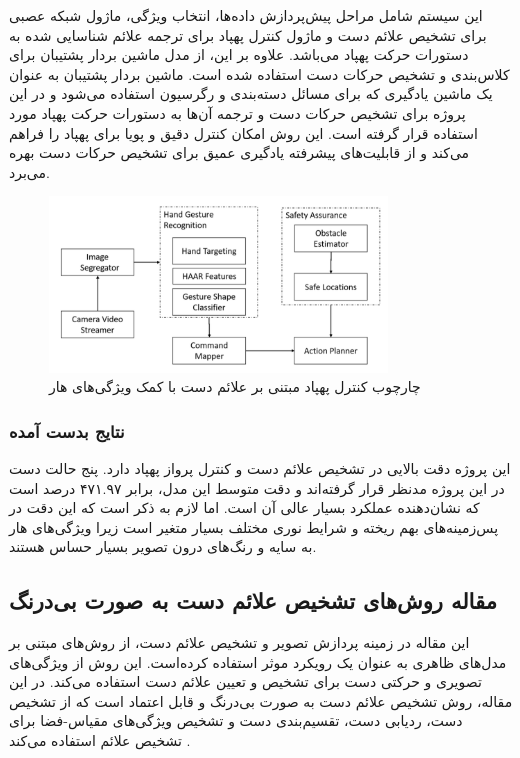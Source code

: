 این سیستم شامل مراحل پیش‌پردازش داده‌ها، انتخاب ویژگی، ماژول شبکه عصبی برای تشخیص علائم دست و ماژول کنترل پهپاد برای ترجمه 
علائم‌ شناسایی شده به دستورات حرکت پهپاد می‌باشد. علاوه بر این، از مدل ماشین بردار پشتیبان برای کلاس‌بندی و تشخیص حرکات دست استفاده شده است. ماشین بردار پشتیبان به عنوان یک ماشین یادگیری 
 که برای مسائل دسته‌بندی و رگرسیون استفاده می‌شود و در این پروژه برای تشخیص حرکات دست و ترجمه آن‌ها به دستورات حرکت پهپاد مورد استفاده قرار گرفته است. این روش امکان 
کنترل دقیق و پویا برای پهپاد را فراهم می‌کند و از قابلیت‌های پیشرفته یادگیری عمیق برای تشخیص حرکات دست بهره می‌برد.

\begin{figure}[h]
    \centering
    \includegraphics[width=0.8\textwidth]{Haar2.png}
    \caption[چارچوب کنترل پهپاد مبتنی بر علائم دست با کمک ویژگی‌های هار]{چارچوب کنترل پهپاد مبتنی بر علائم دست با کمک ویژگی‌های هار\cite{natarajan2018hand}}
\end{figure}

\subsubsection{\protect\textbf{ نتایج بدست آمده}}
این پروژه دقت بالایی در تشخیص علائم دست و کنترل پرواز پهپاد دارد. پنج حالت دست در این پروژه مدنظر قرار گرفته‌اند و دقت متوسط این مدل، برابر ۴۷۱.۹۷ درصد 
است که نشان‌دهنده عملکرد بسیار عالی آن است. اما لازم به ذکر است که این دقت در پس‌زمینه‌های بهم ریخته و شرایط نوری مختلف 
بسیار متغیر است زیرا ویژگی‌های هار به سایه و رنگ‌های درون تصویر بسیار حساس هستند.



\subsection[مقاله روش‌های تشخیص علائم دست به صورت بی‌درنگ]{مقاله روش‌های تشخیص علائم دست به صورت بی‌درنگ \protect{}}
این مقاله در زمینه پردازش تصویر و تشخیص علائم‌ دست، از روش‌های مبتنی بر مدل‌های ظاهری به عنوان یک رویکرد موثر استفاده کرده‌‌است.
این روش‌ از ویژگی‌های تصویری و حرکتی دست برای تشخیص و تعیین علائم‌ دست استفاده می‌کند. در این مقاله، روش تشخیص علائم دست به صورت بی‌درنگ و 
قابل اعتماد است که  از تشخیص دست، ردیابی دست، تقسیم‌بندی دست و تشخیص ویژگی‌های مقیاس-فضا برای تشخیص علائم استفاده می‌کند \cite{fang2007real}.

